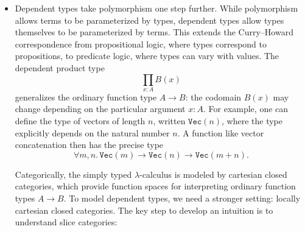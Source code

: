 \begin{itemize}
  Take
  \(
    \texttt{List} : \mathbf{Set} \to \mathbf{Set},
  \)
  sending a set $A$ to the set of lists of elements of $A$, and a function $f: A \to B$ to the induced function $\texttt{map}(f): \texttt{List}(A) \to \texttt{List}(B)$. This functorial perspective captures the way type constructors preserve structure across mappings. A polymorphic function
  \[
    \Lambda \alpha.\, t : \forall \alpha.\, F(\alpha) \to G(\alpha)
  \]
  is then interpreted as a natural transformation $\eta: F \Rightarrow G$ between two functors $F, G: \mathcal{C} \to \mathcal{C}$. The naturality condition requires that for every morphism $f: A \to B$ in $\mathcal{C}$, the following diagram commutes:
  \[
    \begin{tikzcd}[row sep=huge, column sep=huge]
      F(A) \arrow[r, "\eta_A"] \arrow[d, "F(f)"'] & G(A) \arrow[d, "G(f)"] \\
      F(B) \arrow[r, "\eta_B"'] & G(B)
    \end{tikzcd}
  \]
  This expresses the uniformity of polymorphism: the function cannot exploit the particular structure of any type $A$, but must behave consistently with respect to all structure-preserving maps between types. In practice, this explains why polymorphic definitions enjoy parametricity and why they give rise to \textit{``theorems for free.''}. See \cite{wadler1989theorems}.

\item Dependent types take polymorphism one step further. While polymorphism allows terms to be parameterized by types, dependent types allow types themselves to be parameterized by terms. This extends the Curry--Howard correspondence from propositional logic, where types correspond to propositions, to predicate logic, where types can vary with values. The dependent product type
  \[
    \prod_{x:A} B(x)
  \]
  generalizes the ordinary function type $A \to B$: the codomain $B(x)$ may change depending on the particular argument $x:A$. For example, one can define the type of vectors of length $n$, written $\texttt{Vec}(n)$, where the type explicitly depends on the natural number $n$. A function like vector concatenation then has the precise type
  \[
    \forall m,n.\, \texttt{Vec}(m) \to \texttt{Vec}(n) \to \texttt{Vec}(m+n).
  \]

  Categorically, the simply typed $\lambda$-calculus is modeled by cartesian closed categories, which provide function spaces for interpreting ordinary function types $A \to B$. To model dependent types, we need a stronger setting: locally cartesian closed categories. The key step to develop an intuition is to understand slice categories:


\end{itemize}
